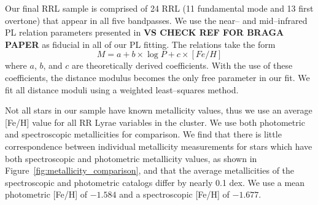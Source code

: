 \documentclass[a4paper,fleqn,usenatbib]{mnras}
\begin{document}
Our final RRL sample is comprised of 24 RRL (11 fundamental mode and 13 first overtone) that appear in all five bandpasses. We use the near-- and mid--infrared PL relation parameters presented in {\bf VS CHECK REF FOR BRAGA PAPER} as fiducial in all of our PL fitting. The relations take the form
\begin{equation}M = a + b\times\log P + c\times[Fe/H]\end{equation}
where $a$, $b$, and $c$ are theoretically derived coefficients.
With the use of these coefficients, the distance modulus becomes the only free parameter in our fit. We fit all distance moduli using a weighted least--squares method.

Not all stars in our sample have known metallicity values, thus we use an average [Fe/H] value for all RR Lyrae variables in the cluster. We use both photometric \citep{2000AJ....119.1824R} and spectroscopic \citep{2006ApJ...640L..43S} metallicities for comparison. We find that there is little correspondence between individual metallicity measurements for stars which have both spectroscopic and photometric metallicity values, as shown in Figure~\ref{fig:metallicity_comparison}, and that the average metallicities of the spectroscopic and photometric catalogs differ by nearly 0.1 dex. We use a mean photometric [Fe/H] of  $-1.584$ and a spectroscopic [Fe/H] of $-1.677$.
\end{document}
